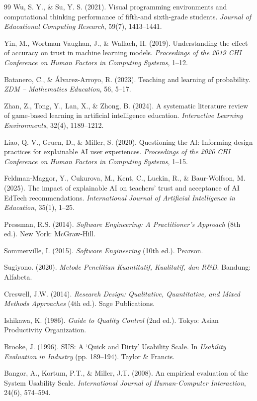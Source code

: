 \begin{thebibliography}{99}
Wu, S. Y., \& Su, Y. S. (2021). Visual programming environments and computational thinking performance of fifth-and sixth-grade students. \textit{Journal of Educational Computing Research}, 59(7), 1413--1441.


Yin, M., Wortman Vaughan, J., \& Wallach, H. (2019). Understanding the effect of accuracy on trust in machine learning models. \textit{Proceedings of the 2019 CHI Conference on Human Factors in Computing Systems}, 1--12.

Batanero, C., \& \'Alvarez-Arroyo, R. (2023). Teaching and learning of probability. \textit{ZDM -- Mathematics Education}, 56, 5--17.

Zhan, Z., Tong, Y., Lan, X., \& Zhong, B. (2024). A systematic literature review of game-based learning in artificial intelligence education. \textit{Interactive Learning Environments}, 32(4), 1189--1212.

Liao, Q. V., Gruen, D., \& Miller, S. (2020). Questioning the AI: Informing design practices for explainable AI user experiences. \textit{Proceedings of the 2020 CHI Conference on Human Factors in Computing Systems}, 1--15.

Feldman-Maggor, Y., Cukurova, M., Kent, C., Luckin, R., \& Baur-Wolfson, M. (2025). The impact of explainable AI on teachers' trust and acceptance of AI EdTech recommendations. \textit{International Journal of Artificial Intelligence in Education}, 35(1), 1--25.


Pressman, R.S. (2014). \textit{Software Engineering: A Practitioner's Approach} (8th ed.). New York: McGraw-Hill.

Sommerville, I. (2015). \textit{Software Engineering} (10th ed.). Pearson.

Sugiyono. (2020). \textit{Metode Penelitian Kuantitatif, Kualitatif, dan R\&D}. Bandung: Alfabeta.

Creswell, J.W. (2014). \textit{Research Design: Qualitative, Quantitative, and Mixed Methods Approaches} (4th ed.). Sage Publications.

Ishikawa, K. (1986). \textit{Guide to Quality Control} (2nd ed.). Tokyo: Asian Productivity Organization.

Brooke, J. (1996). SUS: A `Quick and Dirty' Usability Scale. In \textit{Usability Evaluation in Industry} (pp. 189--194). Taylor \& Francis.

Bangor, A., Kortum, P.T., \& Miller, J.T. (2008). An empirical evaluation of the System Usability Scale. \textit{International Journal of Human-Computer Interaction}, 24(6), 574--594.

\end{thebibliography}

